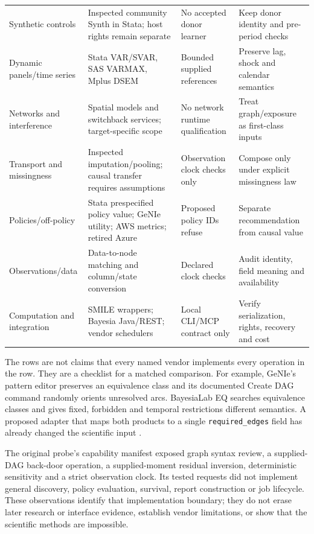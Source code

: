 \begin{longtable}{@{}P{.18\linewidth}P{.29\linewidth}P{.21\linewidth}P{.23\linewidth}@{}}
Synthetic controls & Inspected community Synth in Stata; host rights remain separate & No accepted donor learner & Keep donor identity and pre-period checks \\
Dynamic panels/time series & Stata VAR/SVAR, SAS VARMAX, Mplus DSEM & Bounded supplied references & Preserve lag, shock and calendar semantics \\
Networks and interference & Spatial models and switchback services; target-specific scope & No network runtime qualification & Treat graph/exposure as first-class inputs \\
Transport and missingness & Inspected imputation/pooling; causal transfer requires assumptions & Observation clock checks only & Compose only under explicit missingness law \\
Policies/off-policy & Stata prespecified policy value; GeNIe utility; AWS metrics; retired Azure & Proposed policy IDs refuse & Separate recommendation from causal value \\
Observations/data & Data-to-node matching and column/state conversion & Declared clock checks & Audit identity, field meaning and availability \\
Computation and integration & SMILE wrappers; Bayesia Java/REST; vendor schedulers & Local CLI/MCP contract only & Verify serialization, rights, recovery and cost \\
\bottomrule
\end{longtable}
\endgroup

The rows are not claims that every named vendor implements every operation in
the row. They are a checklist for a matched comparison. For example, GeNIe's
pattern editor preserves an equivalence class and its documented Create DAG
command randomly orients unresolved arcs. BayesiaLab EQ searches equivalence
classes and gives fixed, forbidden and temporal restrictions different
semantics. A proposed adapter that maps both products to a single
\texttt{required\_edges} field has already changed the scientific input
\citep{exec13_genie_pattern,exec13_genie_bs,exec13_bayesia_eq}.

The original probe's capability manifest exposed graph syntax review, a
supplied-DAG back-door operation, a supplied-moment residual inversion,
deterministic sensitivity and a strict observation clock. Its tested requests
did not implement general discovery, policy evaluation, survival, report
construction or job lifecycle. These observations identify that implementation
boundary; they do not erase later research or interface evidence, establish
vendor limitations, or show that the scientific methods are impossible.
\citep{exec16_commercial_runtime,exec16_commercial_matrix}


